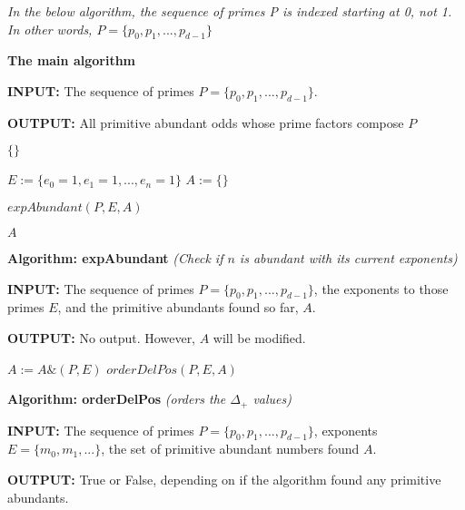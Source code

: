 \documentclass[../paper.tex]{subfiles}
\begin{document}

\textit{In the below algorithm, the sequence of primes P is indexed 
starting at 0, not 1. In other words, $P = \{p_0, p_1, ...,
p_{d-1}\}$}

%

{\setlength{\parindent}{0cm}

\textbf{The main algorithm}

\textbf{INPUT:} The sequence of primes 
$P = \{p_0, p_1, ..., p_{d-1}\}$.

\textbf{OUTPUT:} All primitive abundant odds whose prime factors
compose $P$

}



\begin{algorithmic}
  \RETURN $\{\}$
\ENDIF

\STATE $E := \{e_0 = 1,e_1 = 1,...,e_n = 1\}$
\STATE $A := \{ \}$ %

\STATE $expAbundant(P, E, A)$

\RETURN $A$

\end{algorithmic}

{\setlength{\parindent}{0cm}

\textbf{Algorithm: expAbundant}
\textit{(Check if $n$ is abundant with its current exponents)}

\textbf{INPUT:} The sequence of primes 
$P = \{p_0, p_1, ..., p_{d-1}\}$, the exponents to those 
primes $E$, and the primitive abundants found so far, $A$.

\textbf{OUTPUT:} No output. However, $A$ will be modified.
}

\begin{algorithmic}
		\STATE $A := A \& (P,E)$
		\RETURN
	\ENDIF
	\RETURN
\ENDIF
$orderDelPos(P,E,A)$
\RETURN

\end{algorithmic}

{\setlength{\parindent}{0cm}

\textbf{Algorithm: orderDelPos}
\textit{(orders the $\Delta_+$ values)}

\textbf{INPUT:} The sequence of primes 
$P = \{p_0, p_1, ..., p_{d-1}\}$, exponents $E = \{ m_0, m_1,
...\}$, the set of primitive abundant numbers found $A$.

\textbf{OUTPUT:} True or False, depending on if the algorithm found any primitive abundants.
}
\end{document}
